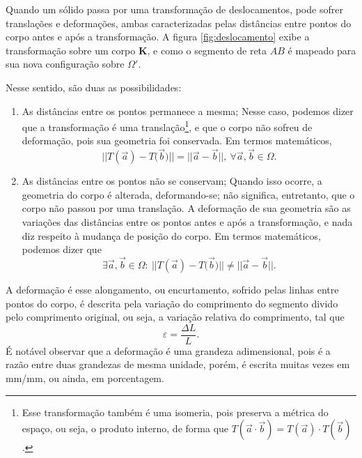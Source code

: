 

Quando um sólido passa por uma transformação de deslocamentos, pode sofrer translações e deformações, ambas caracterizadas pelas distâncias entre pontos do corpo antes e após a transformação. A figura \ref{fig:deslocamento} exibe a transformação sobre um corpo $\bm{K}$, e como o segmento de reta $AB$ é mapeado para sua nova configuração sobre $\Omega'$.

Nesse sentido, são duas as possibilidades:
\begin{enumerate}
    \item As distâncias entre os pontos permanece a mesma;
        Nesse caso, podemos dizer que a transformação é uma translação\footnote{Esse transformação também é uma isomeria, pois preserva a métrica do espaço, ou seja, o produto interno, de forma que $ T(\vec{a} \cdot \vec{b}) = T(\vec{a}) \cdot T(\vec{b}) $.}, e que o corpo não sofreu de deformação, pois sua geometria foi conservada. Em termos matemáticos,
        \begin{equation}
            ||{T(\vec{a}) - T(\vec{b}})|| = ||{\vec{a} - \vec{b}}||, \ \forall \vec{a}, \vec{b} \in \Omega. 
        \end{equation}        
    \item As distâncias entre os pontos não se conservam;
        Quando isso ocorre, a geometria do corpo é alterada, deformando-se; não significa, entretanto, que o corpo não passou por uma translação. A deformação de sua geometria são as variações das distâncias entre os pontos antes e após a transformação, e nada diz respeito à mudança de posição do corpo. Em termos matemáticos, podemos dizer que
        \begin{equation}
             \exists \vec{a}, \vec{b} \in \Omega : \ ||{T(\vec{a}) - T(\vec{b}})|| \neq ||{\vec{a} - \vec{b}}||.
        \end{equation}
\end{enumerate}

A deformação é esse alongamento, ou encurtamento, sofrido pelas linhas entre pontos do corpo, é descrita pela variação do comprimento do segmento divido pelo comprimento original, ou seja, a variação relativa do comprimento, tal que
\begin{equation}
    \varepsilon = \frac{\Delta L}{L}.
\end{equation}
É notável observar que a deformação é uma grandeza adimensional, pois é a razão entre duas grandezas de mesma unidade, porém, é escrita muitas vezes em mm/mm, ou ainda, em porcentagem.

